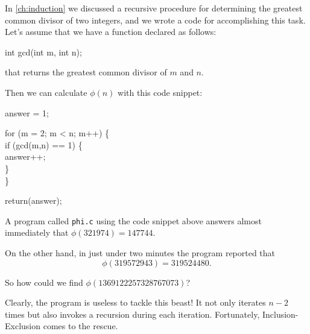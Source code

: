 In \autoref{ch:induction} we discussed a recursive procedure for
determining the greatest common divisor of two integers, and we wrote
a code for accomplishing this task.  Let's assume that we have a
function declared as follows:

\medskip
\noindent
\begin{tt}
int gcd(int m, int n);
\end{tt}

\medskip
\noindent
that returns the greatest common divisor of $m$ and $n$.

Then we can calculate $\phi(n)$ with this code snippet:

\begingroup
\parindent0pt
\begin{tt}
answer = 1;

for  (m = 2; m < n; m++) \{\\
\mbox{}\hspace{.25in} if  (gcd(m,n) == 1) \{\\
\mbox{}\hspace{.5in} answer++;\\
\mbox{}\hspace{.25in} \}\\
\}

return(answer);
\end{tt}
\endgroup

\medskip 

A program called \texttt{phi.c} using the code snippet above answers
almost immediately that $\phi(321974) = 147744$.

On the other hand, in just under two minutes the
program reported that 
\[
\phi(319572943) = 319524480.
\]

So how could we find $\phi(1369122257328767073)$?

Clearly, the program is useless to tackle this beast! It not only
iterates $n-2$ times but also invokes a recursion during each
iteration. Fortunately, Inclusion-Exclusion comes to the rescue.

